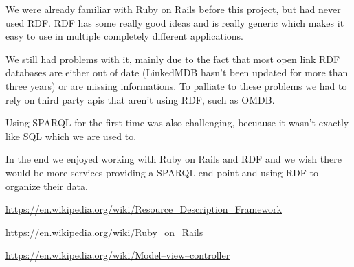 \documentclass[12pt,a4paper]{article}
\begin{document}
We were already familiar with Ruby on Rails before this project, but had never used RDF. RDF has some really good ideas and is really generic which makes it easy to use in multiple completely different applications. 

We still had problems with it, mainly due to the fact that most open link RDF databases are either out of date (LinkedMDB hasn't been updated for more than three years) or are missing informations. To palliate to these problems we had to rely on third party apis that aren't using RDF, such as OMDB.

Using SPARQL for the first time was also challenging, becuause it wasn't exactly like SQL which we are used to.

In the end we enjoyed working with Ruby on Rails and RDF and we wish there would be more services providing a SPARQL end-point and using RDF to organize their data.




\newpage
\begin{thebibliography}{20}

\href{https://en.wikipedia.org/wiki/Resource\_Description\_Framework}{https://en.wikipedia.org/wiki/Resource\_Description\_Framework}

\href{https://en.wikipedia.org/wiki/Ruby\_on\_Rails}{https://en.wikipedia.org/wiki/Ruby\_on\_Rails}

\href{https://en.wikipedia.org/wiki/Model\%E2\%80\%93view\%E2\%80\%93controller}{https://en.wikipedia.org/wiki/Model–view–controller}
\end{thebibliography}
\end{document}
